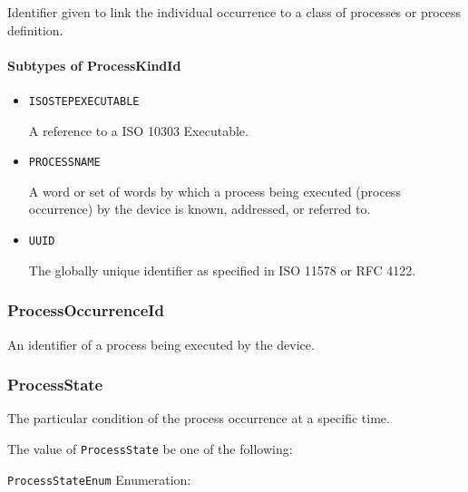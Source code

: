 Identifier given to link the individual occurrence to a class of processes or process definition.



\paragraph{Subtypes of ProcessKindId}\mbox{}
\label{sec:Subtypes of ProcessKindId}

\begin{itemize}

\item \texttt{ISO\textunderscore STEP\textunderscore EXECUTABLE}


A reference to a ISO 10303 Executable.

\item \texttt{PROCESS\textunderscore NAME}


A word or set of words by which a process being executed (process occurrence) by the device is known, addressed, or referred to.


\item \texttt{UUID}


The globally unique identifier as specified in ISO 11578 or RFC 4122.


\end{itemize}






\subsubsection{ProcessOccurrenceId}
\label{sec:ProcessOccurrenceId}



An identifier of a process being executed by the device.



\subsubsection{ProcessState}
\label{sec:ProcessState}



The particular condition of the process occurrence at a specific time.


The value of \texttt{ProcessState} \MUST be one of the following: 


\texttt{ProcessStateEnum} Enumeration:

